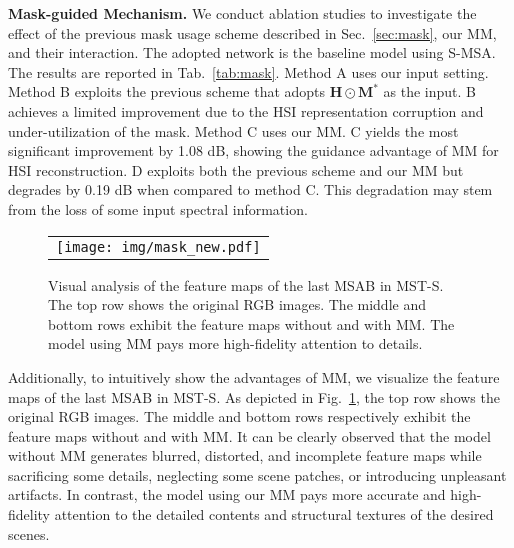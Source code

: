 \documentclass[10pt,twocolumn,letterpaper]{article}
\begin{document}
\noindent\textbf{Mask-guided Mechanism.} We conduct ablation studies to investigate the effect of the previous mask usage scheme described in Sec.~\ref{sec:mask}, our MM, and their interaction. The adopted network is the baseline model using S-MSA. The results are reported in Tab.~\ref{tab:mask}.  Method A uses our input setting. Method B exploits the previous scheme that adopts $\mathbf{H}\odot\mathbf{M}^*$ as the input. B achieves a limited improvement due to the HSI representation corruption and under-utilization of the mask. Method C uses our MM. C yields the most significant improvement by 1.08 dB, showing the guidance advantage of MM for HSI reconstruction. D exploits both the previous scheme and our MM but degrades by 0.19 dB when compared to method C. This degradation may stem from the loss of some input spectral information.

\begin{figure}[h]
	\begin{center}
		\begin{tabular}[t]{c} \hspace{-2.5mm} 
			\texttt{[image: img/mask\_new.pdf]}
		\end{tabular}
	\end{center}
	\vspace{-6mm}
	\caption{\small  Visual analysis of the feature maps of the last MSAB in MST-S. The top row shows the original RGB images. The middle and bottom rows exhibit the feature maps without and with MM. The model using MM pays more high-fidelity attention to details.}
	\label{fig:fea}
	\vspace{-5mm}
\end{figure}

Additionally, to intuitively show the advantages of MM, we visualize the feature maps of the last MSAB in MST-S. As depicted in Fig.~\ref{fig:fea}, the top row shows the original RGB images. The middle and bottom rows respectively exhibit the feature maps without and with MM. It can be clearly observed that the model without MM generates blurred, distorted, and incomplete feature maps while sacrificing some details, neglecting some scene patches, or introducing unpleasant artifacts. In contrast, the model using our MM pays more accurate and high-fidelity attention to the detailed contents and structural textures of the desired scenes.




\vspace{-3mm}
\end{document}
